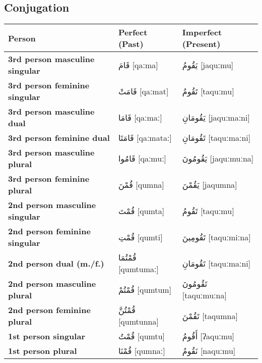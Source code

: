 \documentclass[letter,12pt]{article}
\begin{document}
\subsection{Conjugation}
\begin{longtable}{|>{\raggedright}p{3.5cm}|p{5cm}|p{5cm}|}
\hline
\textbf{Person} & \textbf{Perfect (Past)} & \textbf{Imperfect (Present)} \\
\hline
\textbf{3rd person masculine singular} & \textarabic{قَامَ} [qaːma] & \textarabic{يَقُومُ} [jaquːmu] \\
\hline
\textbf{3rd person feminine singular} & \textarabic{قَامَتْ} [qaːmat] & \textarabic{تَقُومُ} [taquːmu] \\
\hline
\textbf{3rd person masculine dual} & \textarabic{قَامَا} [qaːmaː] & \textarabic{يَقُومَانِ} [jaquːmaːni] \\
\hline
\textbf{3rd person feminine dual} & \textarabic{قَامَتَا} [qaːmataː] & \textarabic{تَقُومَانِ} [taquːmaːni] \\
\hline
\textbf{3rd person masculine plural} & \textarabic{قَامُوا} [qaːmuː] & \textarabic{يَقُومُونَ} [jaquːmuːna] \\
\hline
\textbf{3rd person feminine plural} & \textarabic{قُمْنَ} [qumna] & \textarabic{يَقُمْنَ} [jaqumna] \\
\hline
\textbf{2nd person masculine singular} & \textarabic{قُمْتَ} [qumta] & \textarabic{تَقُومُ} [taquːmu] \\
\hline
\textbf{2nd person feminine singular} & \textarabic{قُمْتِ} [qumti] & \textarabic{تَقُومِينَ} [taquːmiːna] \\
\hline
\textbf{2nd person dual (m./f.)} & \textarabic{قُمْتُمَا} [qumtumaː] & \textarabic{تَقُومَانِ} [taquːmaːni] \\
\hline
\textbf{2nd person masculine plural} & \textarabic{قُمْتُمْ} [qumtum] & \textarabic{تَقُومُونَ} [taquːmuːna] \\
\hline
\textbf{2nd person feminine plural} & \textarabic{قُمْتُنَّ} [qumtunna] & \textarabic{تَقُمْنَ} [taqumna] \\
\hline
\textbf{1st person singular} & \textarabic{قُمْتُ} [qumtu] & \textarabic{أَقُومُ} [ʔaquːmu] \\
\hline
\textbf{1st person plural} & \textarabic{قُمْنَا} [qumnaː] & \textarabic{نَقُومُ} [naquːmu] \\
\hline
\end{longtable}
\end{document}
